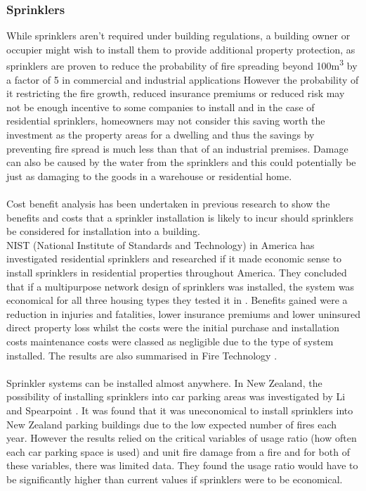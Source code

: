 \documentclass[table,a4paper,oneside]{book}
\begin{document}
\subsubsection{Sprinklers}
While sprinklers aren't required under building regulations, a building owner or occupier might wish to install them to provide additional property protection, as sprinklers are proven to reduce the probability of fire spreading beyond 100m\textsuperscript{3} by a factor of 5 in commercial and industrial applications \citep{Melinek1993299}
However the probability of it restricting the fire growth, reduced insurance premiums or reduced risk may not be enough incentive to some companies to install and in the case of residential sprinklers, homeowners may not consider this saving worth the investment as the property areas for a dwelling and thus the savings by preventing fire spread is much less than that of an industrial premises. Damage can also be caused by the water from the sprinklers and this could potentially be just as damaging to the goods in a warehouse or residential home.
\\
\\
Cost benefit analysis has been undertaken in previous research to show the benefits and costs that a sprinkler installation is likely to incur should sprinklers be considered for installation into a building.
\\
NIST (National Institute of Standards and Technology) in America has investigated residential sprinklers and researched if it made economic sense to install sprinklers in residential properties throughout America. They concluded that if a multipurpose network design of sprinklers was installed, the system was economical for all three housing types they tested it in \citep{Butry2007}. Benefits gained were a reduction in injuries and fatalities, lower insurance premiums and lower uninsured direct property loss whilst the costs were the initial purchase and installation costs  maintenance costs were classed as negligible due to the type of system installed. The results are also summarised in Fire Technology \citep{ISI:000263059100006}.
\\
\\
Sprinkler systems can be installed almost anywhere. In New Zealand, the possibility of installing sprinklers into car parking areas was investigated by Li and Spearpoint \citep{Li2004}. It was found that it was uneconomical to install sprinklers into New Zealand parking buildings due to the low expected number of fires each year. However the results relied on the critical variables of usage ratio (how often each car parking space is used) and unit fire damage from a fire and for both of these variables, there was limited data. They found the usage ratio would have to be significantly higher than current values if sprinklers were to be economical.
\end{document}
